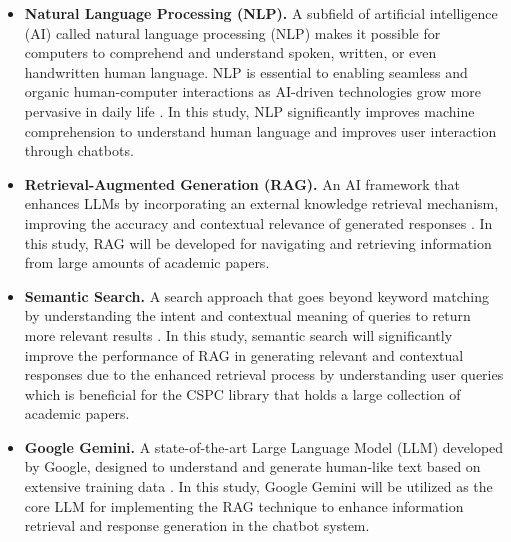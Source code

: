 \begin{refsection}
\begin{itemize}
    \item \textbf{Natural Language Processing (NLP).} A subfield of artificial intelligence (AI) called natural language processing (NLP) makes it possible for computers to comprehend and understand spoken, written, or even handwritten human language. NLP is essential to enabling seamless and organic human-computer interactions as AI-driven technologies grow more pervasive in daily life \cite{ramirez2024natural}. In this study, NLP significantly improves machine comprehension to understand human language and improves user interaction through chatbots.

    \item \textbf{Retrieval-Augmented Generation (RAG).} An AI framework that enhances LLMs by incorporating an external knowledge retrieval mechanism, improving the accuracy and contextual relevance of generated responses \cite{lewis2020retrieval}. In this study, RAG will be developed for navigating and retrieving information from large amounts of academic papers.

    \item \textbf{Semantic Search.} A search approach that goes beyond keyword matching by understanding the intent and contextual meaning of queries to return more relevant results \cite{mahboub2024evaluation}. In this study, semantic search will significantly improve the performance of RAG in generating relevant and contextual responses due to the enhanced retrieval process by understanding user queries which is beneficial for the CSPC library that holds a large collection of academic papers.
   
    \item \textbf{Google Gemini.} A state-of-the-art Large Language Model (LLM) developed by Google, designed to understand and generate human-like text based on extensive training data \cite{lee2025gemini}. In this study, Google Gemini will be utilized as the core LLM for implementing the RAG technique to enhance information retrieval and response generation in the chatbot system.
\end{itemize}

\clearpage

\printbibliography[heading=subbibintoc, title={\centering Notes}]
\end{refsection}
